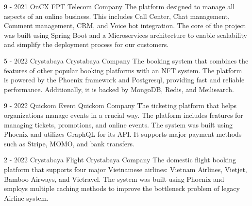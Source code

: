 \documentclass[10pt,A4]{article}
\begin{document}
\begin{paracol}{2}
\begin{rightcolumn}
{}

\cvevent
	{9 - 2021}
	{OnCX}
	{FPT Telecom Company}
	{The platform designed to manage all aspects of an online business. This includes Call Center, Chat management, Comment management, CRM, and Voice bot integration. The core of the project was built using Spring Boot and a Microservices architecture to enable scalability and simplify the deployment process for our customers.}

\cvevent
	{5 - 2022}
	{Crystabaya}
	{Crystabaya Company}
	{The booking system that combines the features of other popular booking platforms with an NFT system. The platform is powered by the Phoenix framework and Postgresql, providing fast and reliable performance. Additionally, it is backed by MongoDB, Redis, and Meilisearch.}

\cvevent
	{9 - 2022}
	{Quickom Event}
	{Quickom Company}
	{The ticketing platform that helps organizations manage events in a crucial way. The platform includes features for managing tickets, promotions, and online events. The system was built using Phoenix and utilizes GraphQL for its API. It supports major payment methods such as Stripe, MOMO, and bank transfers.}

\cvevent
	{2 - 2022}
	{Crystabaya Flight}
	{Crystabaya Company}
	{The domestic flight booking platform that supports four major Vietnamese airlines: Vietnam Airlines, Vietjet, Bamboo Airways, and Vietravel. The system was built using Phoenix and employs multiple caching methods to improve the bottleneck problem of legacy Airline system.}

\end{rightcolumn}
\end{paracol}
\end{document}
